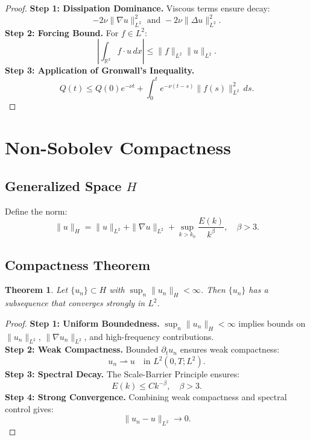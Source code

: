 \documentclass[12pt]{article}
\newtheorem{theorem}{Theorem}[section]
\theoremstyle{definition}
\theoremstyle{remark}
\begin{document}
\begin{proof}
\textbf{Step 1: Dissipation Dominance.} Viscous terms ensure decay:
\begin{equation}
-2\nu \|\nabla u\|_{L^2}^2 \text{ and } -2\nu \|\Delta u\|_{L^2}^2.
\end{equation}
\textbf{Step 2: Forcing Bound.} For $f \in L^2$:
\begin{equation}
\left| \int_{\mathbb{R}^3} f \cdot u \, dx \right| \leq \|f\|_{L^2} \|u\|_{L^2}.
\end{equation}
\textbf{Step 3: Application of Gronwall's Inequality.}
\begin{equation}
Q(t) \leq Q(0)e^{-\nu t} + \int_0^t e^{-\nu (t-s)} \|f(s)\|_{L^2}^2 \, ds.
\end{equation}
\end{proof}

\section{Non-Sobolev Compactness}

\subsection{Generalized Space $H$}
Define the norm:
\begin{equation}
\|u\|_H = \|u\|_{L^2} + \|\nabla u\|_{L^2} + \sup_{k > k_0} \frac{E(k)}{k^\beta}, \quad \beta > 3.
\end{equation}

\subsection{Compactness Theorem}
\begin{theorem}
Let $\{u_n\} \subset H$ with $\sup_n \|u_n\|_H < \infty$. Then $\{u_n\}$ has a subsequence that converges strongly in $L^2$.
\end{theorem}

\begin{proof}
\textbf{Step 1: Uniform Boundedness.} $\sup_n \|u_n\|_H < \infty$ implies bounds on $\|u_n\|_{L^2}$, $\|\nabla u_n\|_{L^2}$, and high-frequency contributions.\\
\textbf{Step 2: Weak Compactness.} Bounded $\partial_t u_n$ ensures weak compactness:
\begin{equation}
u_n \rightharpoonup u \quad \text{in } L^2(0, T; L^2).
\end{equation}
\textbf{Step 3: Spectral Decay.} The Scale-Barrier Principle ensures:
\begin{equation}
E(k) \leq Ck^{-\beta}, \quad \beta > 3.
\end{equation}
\textbf{Step 4: Strong Convergence.} Combining weak compactness and spectral control gives:
\begin{equation}
\|u_n - u\|_{L^2} \to 0.
\end{equation}
\end{proof}
\end{document}
